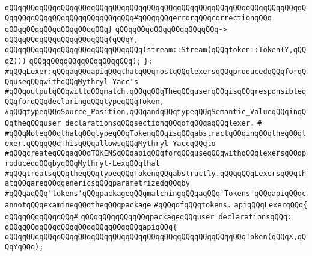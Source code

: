 \verb|qQQqqQQqqQQqqQQqqQQqqQQqqQQqqQQqqQQqqQQqqQQqqQQqqQQqqQQqqQQqqQQqqQQqqQQqqQQqqQQqqQQqqQQqqQQqqQQqqQQq#qQQqqQQqerrorqQQqcorrectionqQQq|\newline
\verb|qQQqqQQqqQQqqQQqqQQqqQQq}|\newline
\verb|qQQqqQQqqQQqqQQqqQQqqQQq->|\newline
\verb|qQQqqQQqqQQqqQQqqQQqqQQq(qQQqY,|\newline
\verb|qQQqqQQqqQQqqQQqqQQqqQQqqQQqqQQq(stream::Stream(qQQqtoken::Token(Y,qQQqZ)))|\newline
\verb|qQQqqQQqqQQqqQQqqQQqqQQq);|\newline
\verb|};|\newline
\newline
\verb|#qQQqLexer:qQQqaqQQqapiqQQqthatqQQqmostqQQqlexersqQQqproducedqQQqforqQQquseqQQqwithqQQqMythryl-Yacc's|\newline
\verb|#qQQqoutputqQQqwillqQQqmatch.qQQqqQQqTheqQQquserqQQqisqQQqresponsibleqQQqforqQQqdeclaringqQQqtypeqQQqToken,|\newline
\verb|#qQQqtypeqQQqSource_Position,qQQqandqQQqtypeqQQqSemantic_ValueqQQqinqQQqtheqQQquser_declarationsqQQqsectionqQQqofqQQqaqQQqlexer.|\newline
\verb|#|\newline
\verb|#qQQqNoteqQQqthatqQQqtypeqQQqTokenqQQqisqQQqabstractqQQqinqQQqtheqQQqlexer.qQQqqQQqThisqQQqallowsqQQqMythryl-YaccqQQqto|\newline
\verb|#qQQqcreateqQQqaqQQqTOKENSqQQqapiqQQqforqQQquseqQQqwithqQQqlexersqQQqproducedqQQqbyqQQqMythryl-LexqQQqthat|\newline
\verb|#qQQqtreatsqQQqtheqQQqtypeqQQqTokenqQQqabstractly.qQQqqQQqLexersqQQqthatqQQqareqQQqgenericsqQQqparametrizedqQQqby|\newline
\verb|#qQQqaqQQq'tokens'qQQqpackageqQQqmatchingqQQqaqQQq'Tokens'qQQqapiqQQqcannotqQQqexamineqQQqtheqQQqpackage|\newline
\verb|#qQQqofqQQqtokens.|\newline
\newline
\newline
\verb|apiqQQqLexerqQQq{|\newline
\verb|qQQqqQQqqQQqqQQq#|\newline
\verb|qQQqqQQqqQQqqQQqpackageqQQquser_declarationsqQQq:|\newline
\verb|qQQqqQQqqQQqqQQqqQQqqQQqqQQqqQQqapiqQQq{|\newline
\verb|qQQqqQQqqQQqqQQqqQQqqQQqqQQqqQQqqQQqqQQqqQQqqQQqqQQqqQQqToken(qQQqX,qQQqYqQQq);|\newline
